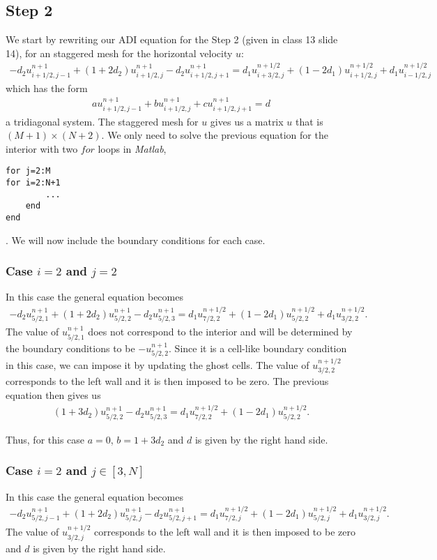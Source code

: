\subsection{Step 2}
We start by rewriting our ADI equation for the Step 2 (given in class 13 slide 14), for an staggered mesh for the horizontal velocity $u$:
\begin{align*}
-d_2u_{i+1/2,j-1}^{n+1}+(1+2d_2)u_{i+1/2,j}^{n+1}-d_2u_{i+1/2,j+1}^{n+1}=d_1u_{i+3/2,j}^{n+1/2}+(1-2d_1)u_{i+1/2,j}^{n+1/2}+d_1u_{i-1/2,j}^{n+1/2}
\end{align*}
which has the form 
\begin{align*}
au_{i+1/2,j-1}^{n+1}+bu_{i+1/2,j}^{n+1}+cu_{i+1/2,j+1}^{n+1}=d
\end{align*}
a tridiagonal system. The staggered mesh for $u$ gives us a matrix $u$ that is $(M+1)\times(N+2)$. We only need to solve the previous equation for the interior with two $for$ loops in \textsl{Matlab},
\begin{verbatim}
for j=2:M
for i=2:N+1
		...
	end
end
\end{verbatim}.
We will now include the boundary conditions for each case.
\subsubsection*{Case $i=2$ and $j=2$}
In this case the general equation becomes
\begin{align*}
-d_2u_{5/2,1}^{n+1}+(1+2d_2)u_{5/2,2}^{n+1}-d_2u_{5/2,3}^{n+1}=d_1u_{7/2,2}^{n+1/2}+(1-2d_1)u_{5/2,2}^{n+1/2}+d_1u_{3/2,2}^{n+1/2}.
\end{align*}
The value of $u_{5/2,1}^{n+1}$ does not correspond to the interior and will be determined by the boundary conditions to be $-u_{5/2,2}^{n+1}$. Since it is a cell-like boundary condition in this case, we can impose it by updating the ghost cells. The value of $u_{3/2,2}^{n+1/2}$ corresponds to the left wall and it is then imposed to be zero. The previous equation then gives us
\begin{align*}
(1+3d_2)u_{5/2,2}^{n+1}-d_2u_{5/2,3}^{n+1}=d_1u_{7/2,2}^{n+1/2}+(1-2d_1)u_{5/2,2}^{n+1/2}.
\end{align*}

Thus, for this case $a=0$, $b=1+3d_2$ and $d$ is given by the right hand side. 

\subsubsection*{Case $i=2$ and $j\in[3,N]$}
In this case the general equation becomes
\begin{align*}
-d_2u_{5/2,j-1}^{n+1}+(1+2d_2)u_{5/2,j}^{n+1}-d_2u_{5/2,j+1}^{n+1}=d_1u_{7/2,j}^{n+1/2}+(1-2d_1)u_{5/2,j}^{n+1/2}+d_1u_{3/2,j}^{n+1/2}.
\end{align*}
The value of $u_{3/2,j}^{n+1/2}$ corresponds to the left wall and it is then imposed to be zero and $d$ is given by the right hand side. 

